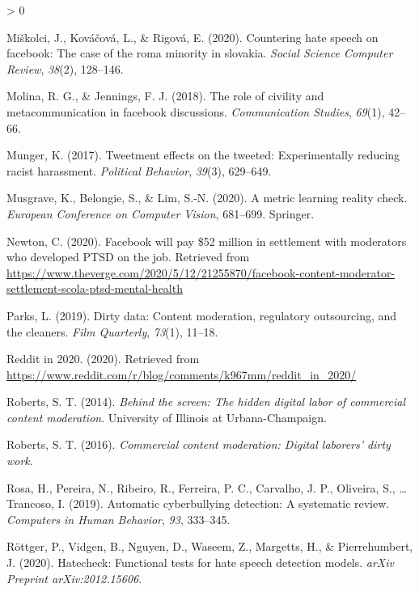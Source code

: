 \documentclass[
  10pt,
  dvipsnames,enabledeprecatedfontcommands]{scrartcl}
\newlength{\cslhangindent}
\newenvironment{CSLReferences}[2] %
 {%
  \setlength{\parindent}{0pt}
  \ifodd #1 \everypar{\setlength{\hangindent}{\cslhangindent}}\ignorespaces\fi
  \ifnum #2 > 0
  \setlength{\parskip}{#2\baselineskip}
  \fi
 }%
 {}
\begin{document}
\begin{CSLReferences}{1}{0}
\leavevmode\hypertarget{ref-mivskolci2020countering}{}%
Miškolci, J., Kováčová, L., \& Rigová, E. (2020). Countering hate speech
on facebook: The case of the roma minority in slovakia. \emph{Social
Science Computer Review}, \emph{38}(2), 128--146.

\leavevmode\hypertarget{ref-molina2018role}{}%
Molina, R. G., \& Jennings, F. J. (2018). The role of civility and
metacommunication in facebook discussions. \emph{Communication Studies},
\emph{69}(1), 42--66.

\leavevmode\hypertarget{ref-munger2017tweetment}{}%
Munger, K. (2017). Tweetment effects on the tweeted: Experimentally
reducing racist harassment. \emph{Political Behavior}, \emph{39}(3),
629--649.

\leavevmode\hypertarget{ref-musgrave2020metric}{}%
Musgrave, K., Belongie, S., \& Lim, S.-N. (2020). A metric learning
reality check. \emph{European Conference on Computer Vision}, 681--699.
Springer.

\leavevmode\hypertarget{ref-newton_facebook_2020}{}%
Newton, C. (2020). Facebook will pay \$52 million in settlement with
moderators who developed {PTSD} on the job. Retrieved from
\url{https://www.theverge.com/2020/5/12/21255870/facebook-content-moderator-settlement-scola-ptsd-mental-health}

\leavevmode\hypertarget{ref-parks2019dirty}{}%
Parks, L. (2019). Dirty data: Content moderation, regulatory
outsourcing, and the cleaners. \emph{Film Quarterly}, \emph{73}(1),
11--18.

\leavevmode\hypertarget{ref-noauthor_reddit_nodate}{}%
Reddit in 2020. (2020). Retrieved from
\url{https://www.reddit.com/r/blog/comments/k967mm/reddit_in_2020/}

\leavevmode\hypertarget{ref-roberts2014behind}{}%
Roberts, S. T. (2014). \emph{Behind the screen: The hidden digital labor
of commercial content moderation}. University of Illinois at
Urbana-Champaign.

\leavevmode\hypertarget{ref-roberts2016commercial}{}%
Roberts, S. T. (2016). \emph{Commercial content moderation: Digital
laborers' dirty work}.

\leavevmode\hypertarget{ref-rosa2019automatic}{}%
Rosa, H., Pereira, N., Ribeiro, R., Ferreira, P. C., Carvalho, J. P.,
Oliveira, S., \ldots{} Trancoso, I. (2019). Automatic cyberbullying
detection: A systematic review. \emph{Computers in Human Behavior},
\emph{93}, 333--345.

\leavevmode\hypertarget{ref-rottger2020hatecheck}{}%
Röttger, P., Vidgen, B., Nguyen, D., Waseem, Z., Margetts, H., \&
Pierrehumbert, J. (2020). Hatecheck: Functional tests for hate speech
detection models. \emph{arXiv Preprint arXiv:2012.15606}.


\end{CSLReferences}
\end{document}
